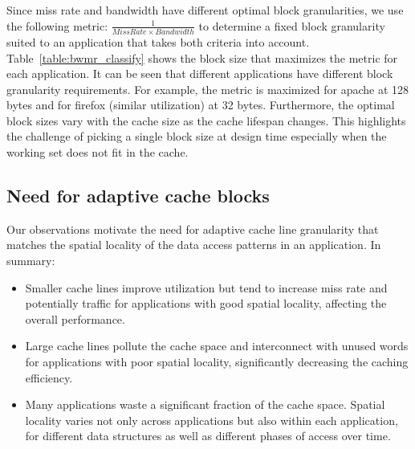 

Since miss rate and bandwidth have different optimal block
granularities, we use the following metric: $\frac{1}{Miss Rate \times
  Bandwidth}$ to determine a fixed block granularity suited to an
application that takes both criteria into account.
Table~\ref{table:bwmr_classify} shows the block size that maximizes
the metric for each application.  It can be seen that different
applications have different block granularity requirements.  For
example, the metric is maximized for apache at 128 bytes and for
firefox (similar utilization) at 32 bytes.  Furthermore, the optimal
block sizes vary with the cache size as the cache lifespan
changes. This highlights the challenge of picking a single block size
at design time especially when the working set does not fit in the
cache.

\subsection{Need for adaptive cache blocks}
Our observations motivate the need for adaptive cache line
granularity that matches the spatial locality of the data access patterns
in an application. In summary:
\begin{itemize}
  \item  Smaller cache lines improve utilization but tend to increase
    miss rate and potentially traffic for applications with good
    spatial locality, affecting the overall performance.
  \item Large cache lines pollute the cache space and interconnect
    with unused words for applications with poor spatial locality, 
   significantly decreasing the caching efficiency.
  \item Many applications waste a significant fraction of the cache
  space. Spatial locality varies not only across applications but also
  within each application, for different data structures as well as 
  different phases of access over time.   

\end{itemize}


